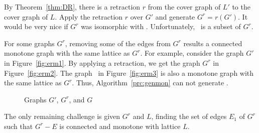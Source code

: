 By Theorem~\ref{thm:DR}, there is a retraction \(r\) from the cover graph of \(L'\) to the cover graph of \(L\)\@.
Apply the retraction \(r\) over \(G'\) and generate \(G^r = r(G')\)\@.
It would be very nice if \(G^r\) was isomorphic with \mG\@. Unfortunately, \mG\ is a subset of \(G^r\)\@.

For some graphs \(G^r\), removing some of the edges from \(G^r\) results a connected 
monotone graph with the same lattice as \(G^r\)\@.
For example, consider the graph \(G'\) in
Figure~\ref{fig:erm1}\@. By applying a retraction, we get the
graph \(G^r\) in Figure~\ref{fig:erm2}\@. The graph
\mG\ in Figure~\ref{fig:erm3} is also a monotone graph with the same lattice 
as \(G^r\)\@. Thus, Algorithm~\ref{prc:genmon} can not generate \mG\@. 

\begin{figure}
\hfill
\subfigure[\ensuremath{G'}]{\label{fig:erm1}}\hfill 
\subfigure[\ensuremath{G^r}]{\label{fig:erm2}}\hfill 
\subfigure[\ensuremath{G}]{\label{fig:erm3}}\hfill 
\caption{Graphs \ensuremath{G'}, \ensuremath{G^r}, and \ensuremath{G}}
\end{figure}

The only remaining challenge is given \(G^r\) and \(L\), 
finding the set of edges \(E_1\) of \(G^r\) such that 
\(G^r - E\) is connected and monotone with lattice \(L\)\@.

